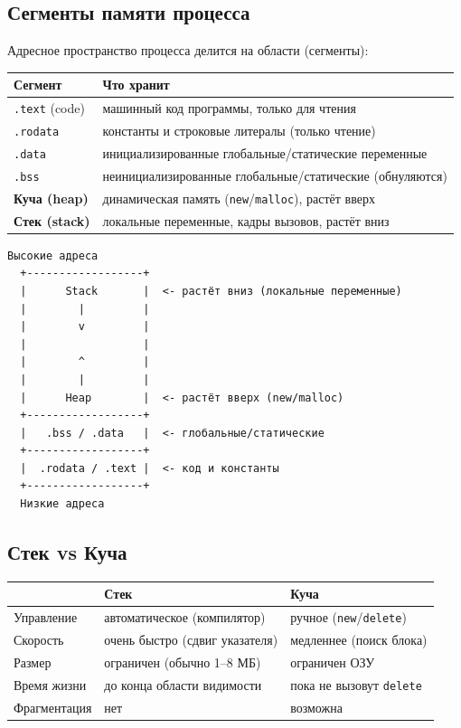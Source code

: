 \subsection{Сегменты памяти процесса}

Адресное пространство процесса делится на области (сегменты):

\begin{center}
\begin{tabular}{lp{9cm}}
\toprule
\textbf{Сегмент} & \textbf{Что хранит} \\
\midrule
\texttt{.text} (code)   & машинный код программы, только для чтения \\
\addlinespace
\texttt{.rodata}        & константы и строковые литералы (только чтение) \\
\addlinespace
\texttt{.data}          & инициализированные глобальные/статические переменные \\
\addlinespace
\texttt{.bss}           & неинициализированные глобальные/статические (обнуляются) \\
\addlinespace
\textbf{Куча (heap)}    & динамическая память (\texttt{new}/\texttt{malloc}), растёт вверх \\
\addlinespace
\textbf{Стек (stack)}   & локальные переменные, кадры вызовов, растёт вниз \\
\bottomrule
\end{tabular}
\end{center}

\begin{lstlisting}[numbers=none]
  Высокие адреса
  +------------------+
  |      Stack       |  <- растёт вниз (локальные переменные)
  |        |         |
  |        v         |
  |                  |
  |        ^         |
  |        |         |
  |      Heap        |  <- растёт вверх (new/malloc)
  +------------------+
  |   .bss / .data   |  <- глобальные/статические
  +------------------+
  |  .rodata / .text |  <- код и константы
  +------------------+
  Низкие адреса
\end{lstlisting}

\subsection{Стек vs Куча}

\begin{center}
\begin{tabular}{lp{4.5cm}p{4.5cm}}
\toprule
& \textbf{Стек} & \textbf{Куча} \\
\midrule
Управление  & автоматическое (компилятор) & ручное (\texttt{new}/\texttt{delete}) \\
\addlinespace
Скорость    & очень быстро (сдвиг указателя) & медленнее (поиск блока) \\
\addlinespace
Размер      & ограничен (обычно 1--8 МБ) & ограничен ОЗУ \\
\addlinespace
Время жизни & до конца области видимости & пока не вызовут \texttt{delete} \\
\addlinespace
Фрагментация & нет & возможна \\
\bottomrule
\end{tabular}
\end{center}

